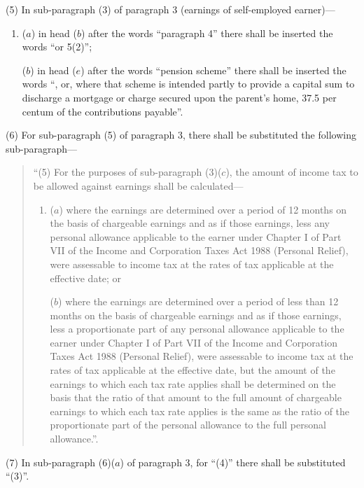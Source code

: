 \documentclass[a4paper]{article}
\begin{document}
(5) In sub-paragraph (3) of paragraph 3 (earnings of self-employed earner)—
\begin{enumerate}\item[]
($a$) in head ($b$) after the words “paragraph 4” there shall be inserted the words “or 5(2)”;

($b$) in head ($e$) after the words “pension scheme” there shall be inserted the words “, or, where that scheme is intended partly to provide a capital sum to discharge a mortgage or charge secured upon the parent’s home, 37.5 per centum of the contributions payable”.
\end{enumerate}

(6) For sub-paragraph (5) of paragraph 3, there shall be substituted the following sub-paragraph—
\begin{quotation}
“(5) For the purposes of sub-paragraph (3)($c$), the amount of income tax to be allowed against earnings shall be calculated—
\begin{enumerate}\item[]
($a$) where the earnings are determined over a period of 12 months on the basis of chargeable earnings and as if those earnings, less any personal allowance applicable to the earner under Chapter I of Part VII of the Income and Corporation Taxes Act 1988 (Personal Relief), were assessable to income tax at the rates of tax applicable at the effective date; or

($b$) where the earnings are determined over a period of less than 12 months on the basis of chargeable earnings and as if those earnings, less a proportionate part of any personal allowance applicable to the earner under Chapter I of Part VII of the Income and Corporation Taxes Act 1988 (Personal Relief), were assessable to income tax at the rates of tax applicable at the effective date, but the amount of the earnings to which each tax rate applies shall be determined on the basis that the ratio of that amount to the full amount of chargeable earnings to which each tax rate applies is the same as the ratio of the proportionate part of the personal allowance to the full personal allowance.”.
\end{enumerate}
\end{quotation}

(7) In sub-paragraph (6)($a$) of paragraph 3, for “(4)” there shall be substituted “(3)”.
\end{document}
